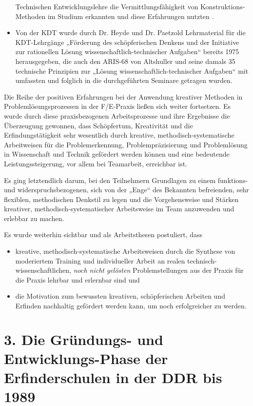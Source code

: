 \documentclass[11pt,a4paper]{article}
\begin{document}
\begin{itemize}
  Technischen Entwicklungslehre die Vermittlungsfähigkeit von
  Konstruktions-Methoden im Studium erkannten und diese Erfahrungen nutzten
  \cite{4,5,6}.
\item Von der KDT wurde durch Dr. Heyde und Dr. Paetzold Lehrmaterial für die
  KDT-Lehrgänge „Förderung des schöpferischen Denkens und der Initiative zur
  rationellen Lösung wissenschaftlich-technischer Aufgaben“ bereits 1975
  \cite{20} herausgegeben, die auch den ARIS-68 von Altshuller und seine
  damals 35 technische Prinzipien zur „Lösung wissenschaftlich-technischer
  Aufgaben“ mit umfassten und folglich in die durchgeführten Seminare getragen
  wurden.
\end{itemize}
Die Reihe der positiven Erfahrungen bei der Anwendung kreativer Methoden in
Problem\-lösungs\-prozessen in der F/E-Praxis ließen sich weiter fortsetzen.
Es wurde durch diese praxisbezogenen Arbeitsprozesse und ihre Ergebnisse die
Überzeugung gewonnen, dass Schöpfertum, Kreativität und die
Erfindungstätigkeit sehr wesentlich durch kreative,
methodisch-systema\-ti\-sche Arbeitweisen für die Problemerkennung,
Problempräzisierung und Problemlösung in Wissenschaft und Technik gefördert
werden können und eine bedeutende Leistungssteigerung, vor allem bei
Teamarbeit, erreichbar ist.

Es ging letztendlich darum, bei den Teilnehmern Grundlagen zu einem funktions-
und widerspruchsbezogenen, sich von der „Enge“ des Bekannten befreienden, sehr
flexiblen, methodischen Denkstil zu legen und die Vorgehensweise und Stärken
kreativer, methodisch-systematischer Arbeitsweise im Team anzuwenden und
erlebbar zu machen.

Es wurde weiterhin sichtbar und als Arbeitsthesen postuliert, dass
\begin{itemize}
\item kreative, methodisch-systematische Arbeitsweisen durch die Synthese von
  moderiertem Training und individueller Arbeit an realen
  technisch-wissenschaftlichen, \emph{noch nicht gelösten} Problemstellungen
  aus der Praxis für die Praxis lehrbar und erlernbar sind und
\item die Motivation zum bewussten kreativen, schöpferischen Arbeiten und
  Erfinden nachhaltig gefördert werden kann, um noch erfolgreicher zu werden.
\end{itemize}

\section*{3. Die Gründungs- und Entwicklungs-Phase der Erfinderschulen in der
  DDR bis 1989} 
 
\end{document}
